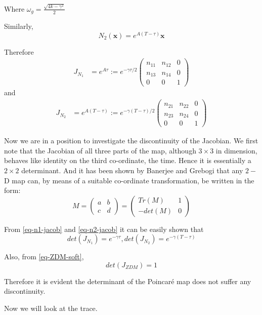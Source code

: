 \documentclass{book}
\renewcommand{\(}{\begin{columns}}
\renewcommand{\)}{\end{columns}}
\newcommand{\<}[1]{\begin{column}{#1}}
\renewcommand{\>}{\end{column}}
\newcommand{\mb}[1]{\mathbf{#1}}
\begin{document}
Where $\omega_g=\frac{\sqrt{4k-\gamma^2}}{2}$



Similarly,
\[
N_2(\mb{x})=e^{A(T-\tau)}\mb{x}
\]

Therefore 
\begin{align}
\label{eq-n1-jacob}
J_{N_1}&=e^{A\tau}
:=e^{-\gamma\tau/2}
\begin{pmatrix}
n_{11} & n_{12} & 0\\
n_{13} & n_{14} & 0\\
0 & 0 & 1
\end{pmatrix}
\end{align}
and
\begin{align}
\label{eq-n2-jacob}
J_{N_2}&=e^{A(T-\tau)}
:=e^{-\gamma(T-\tau)/2}
\begin{pmatrix}
n_{21} & n_{22} & 0\\
n_{23} & n_{24} & 0\\
0 & 0 & 1
\end{pmatrix}
\end{align}


Now we are in a position to investigate the discontinuity of the Jacobian.  We 
first note that the Jacobian of all three parts of the map, although 
$3\times 3$ in dimension, behaves like identity on the third co-ordinate, the 
time.  Hence it is essentially a $2\times 2$ determinant.  And it has been 
shown by Banerjee and Grebogi that any $2-$D map can, by means of a suitable 
co-ordinate transformation, be written in the form:
\[
M=
\begin{pmatrix}
a & b\\
c & d
\end{pmatrix}
=
\begin{pmatrix}
Tr(M) & 1\\
-det(M) & 0
\end{pmatrix}
\]


From \eqref{eq-n1-jacob} and  \eqref{eq-n2-jacob}  it can be easily shown that 
\[
det(J_{N_1})=e^{-\gamma\tau}, det(J_{N_2})=e^{-\gamma(T-\tau)}
\]

Also, from \eqref{eq-ZDM-soft}, \[
det(J_{ZDM})=1
\]

Therefore it is evident the determinant of the Poincaré map does not suffer 
any discontinuity.  

Now we will look at the trace.  
\end{document}
